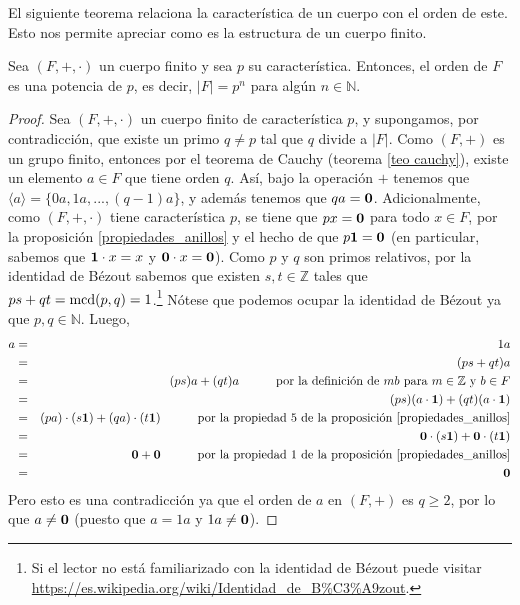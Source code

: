 El siguiente teorema relaciona la característica de un cuerpo con el
orden de este. Esto nos permite apreciar como es la estructura de un
cuerpo finito.
\begin{theorem}\label{orden cuerpo pot carac}
	Sea $(F,+,\cdot)$ un cuerpo finito y sea $p$ su
	característica. Entonces, el orden de $F$ es una potencia de
	$p$, es decir, $|F|=p^n$ para algún $n\in \mathbb{N}$.
\end{theorem}

\begin{proof}
Sea $(F,+,\cdot)$ un cuerpo finito de característica $p$, y
supongamos, por contradicción, que existe un primo $q\neq p$ tal que
$q$ divide a $|F|$. Como $(F,+)$ es un grupo finito, entonces por el
teorema de Cauchy (teorema \ref{teo cauchy}), existe un elemento $a\in
F$ que tiene orden $q$. Así, bajo la operación $+$ tenemos que
$\langle a\rangle = \{ 0 a, 1 a,...,(q-1) a\}$, y además tenemos que
$q a = \mathbf{0}$.
Adicionalmente, como $(F,+,\cdot)$ tiene característica $p$, se tiene
que $p x = \mathbf{0} $ para todo $x \in F$, por la
proposición \ref{propiedades_anillos} y el hecho de que $p \mathbf{1} =\mathbf{0} $
(en particular, sabemos que $\mathbf{1} \cdot x = x$ y $\mathbf{0} \cdot x
= \mathbf{0}$). Como $p$ y $q$ son primos relativos, por la identidad de
Bézout sabemos que existen $s,t\in \mathbb{Z}$ tales que $p s + q t
= {\rm mcd}(p,q) = 1$.\footnote{Si el lector no está familiarizado con la
identidad de Bézout puede
visitar \url{https://es.wikipedia.org/wiki/Identidad_de_B\%C3\%A9zout}.}
Nótese que podemos ocupar la identidad de Bézout ya que
$p,q\in\mathbb{N}$.
Luego,
\begin{eqnarray*}
	a &=& 1a\\
        &=& (p s + q t) a\\
        &=& (p s) a + (q t) a \quad\quad\quad \text{por la definición de $m b$ para $m \in \mathbb{Z}$ y $b \in F$}\\
        &=& (p s) (a \cdot \mathbf{1}) + (q t) (a \cdot \mathbf{1})\\
	&=& (pa) \cdot (s\mathbf{1}) + (qa)\cdot (t\mathbf{1}) \quad\quad\quad \text{por la propiedad 5 de la proposición \ref{propiedades_anillos}}\\
	&=& \mathbf{0} \cdot (s\mathbf{1}) + \mathbf{0} \cdot (t\mathbf{1})\\
	&=& \mathbf{0} + \mathbf{0} \quad\quad\quad \text{por la propiedad 1 de la proposición \ref{propiedades_anillos}}\\
        &=& \mathbf{0}
\end{eqnarray*}
Pero esto es una contradicción ya que el orden de $a$ en $(F,+)$ es
$q\geq 2$, por lo que $a \neq \mathbf{0}$ (puesto que $a = 1a$ y $1a \neq \mathbf{0}$).
\end{proof}

